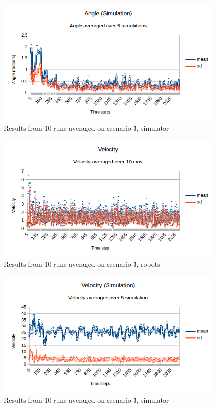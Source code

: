 \begin{figure}[h]
\begin{center}
\includegraphics[width=0.8\linewidth]{figs/runs/3sangle}
\end{center}
\caption[3. Distances, robots]{Results from 10 runs averaged on scenario 3, simulator}
\label{fig:res3sang}
\end{figure}
\begin{figure}[h]
\begin{center}
\includegraphics[width=0.8\linewidth]{figs/runs/3pvel}
\end{center}
\caption[3. Velocity, robots]{Results from 10 runs averaged on scenario 3, robots}
\label{fig:res3pvel}
\end{figure}
\begin{figure}[h]
\begin{center}
\includegraphics[width=0.8\linewidth]{figs/runs/3svel}
\end{center}
\caption[3. Velocity, robots]{Results from 10 runs averaged on scenario 3, simulator}
\label{fig:res3svel}
\end{figure}

